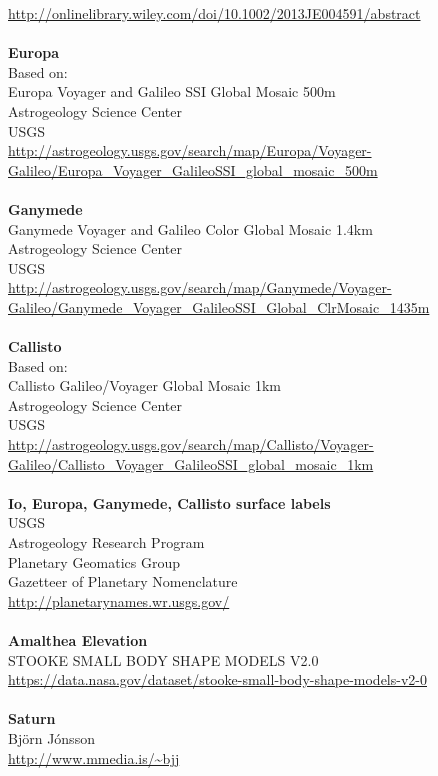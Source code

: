 \documentclass[Orbiter User Manual.tex]{subfiles}
\begin{document}
\url{http://onlinelibrary.wiley.com/doi/10.1002/2013JE004591/abstract}\\
\\
\textbf{Europa}\\
Based on:\\
Europa Voyager and Galileo SSI Global Mosaic 500m\\
Astrogeology Science Center\\
USGS\\
\url{http://astrogeology.usgs.gov/search/map/Europa/Voyager-Galileo/Europa_Voyager_GalileoSSI_global_mosaic_500m}\\
\\
\textbf{Ganymede}\\
Ganymede Voyager and Galileo Color Global Mosaic 1.4km\\
Astrogeology Science Center\\
USGS\\
\url{http://astrogeology.usgs.gov/search/map/Ganymede/Voyager-Galileo/Ganymede_Voyager_GalileoSSI_Global_ClrMosaic_1435m}\\
\\
\textbf{Callisto}\\
Based on:\\
Callisto Galileo/Voyager Global Mosaic 1km\\
Astrogeology Science Center\\
USGS\\
\url{http://astrogeology.usgs.gov/search/map/Callisto/Voyager-Galileo/Callisto_Voyager_GalileoSSI_global_mosaic_1km}\\
\\
\textbf{Io, Europa, Ganymede, Callisto surface labels}\\
USGS\\
Astrogeology Research Program\\
Planetary Geomatics Group\\
Gazetteer of Planetary Nomenclature\\
\url{http://planetarynames.wr.usgs.gov/}\\
\\
\textbf{Amalthea Elevation}\\
STOOKE SMALL BODY SHAPE MODELS V2.0 \\
\url{https://data.nasa.gov/dataset/stooke-small-body-shape-models-v2-0}\\
\\
\textbf{Saturn}\\
Björn Jónsson\\
\url{http://www.mmedia.is/~bjj}\\
\end{document}
